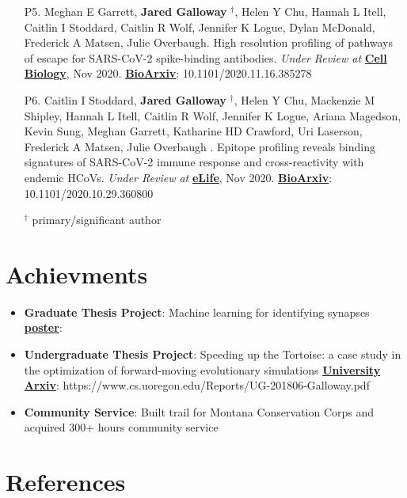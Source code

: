 \documentclass[letterpaper,11pt]{article}
\let\oldhref\href
\renewcommand{\href}[2]{\oldhref{#1}{\bfseries#2}}
\newcommand{\resumeItem}[2]{
  \item\small{
    \textbf{#1}{: #2 \vspace{-2pt}}
  }
}
\newcommand{\resumeSubItem}[2]{\resumeItem{#1}{#2}\vspace{-4pt}}
\newcommand{\resumeSubHeadingListStart}{\begin{itemize}[leftmargin=*]}
\newcommand{\resumeSubHeadingListEnd}{\end{itemize}}
\begin{document}
\begin{enumerate}
\item [P5.] Meghan E Garrett, \textbf{Jared Galloway} $^{\dagger}$, 
Helen Y Chu, Hannah L Itell, Caitlin I Stoddard, Caitlin R Wolf, Jennifer K Logue, Dylan McDonald, Frederick A Matsen, Julie Overbaugh.
High resolution profiling of pathways of escape for SARS-CoV-2 spike-binding antibodies.
\textit{Under Review at}
\href{https://www.nature.com/ncb/}{Cell Biology}, Nov 2020.
\href{https://www.biorxiv.org/content/10.1101/2020.11.16.385278v1.abstract}{BioArxiv}: 10.1101/2020.11.16.385278

\item [P6.] Caitlin I Stoddard, \textbf{Jared Galloway} $^{\dagger}$, 
Helen Y Chu, Mackenzie M Shipley, Hannah L Itell, 
Caitlin R Wolf, Jennifer K Logue, Ariana Magedson, Kevin Sung, Meghan Garrett, Katharine HD Crawford, Uri Laserson, Frederick A Matsen, Julie Overbaugh . 
Epitope profiling reveals binding signatures of SARS-CoV-2 immune response and cross-reactivity with endemic HCoVs.
\textit{Under Review at}
\href{https://elifesciences.org/?gclid=CjwKCAiA6vXwBRBKEiwAYE7iS0LA_KboY5NjoOVJAMq06BEUSsqPFV9R1GA1NUUIgYw2XgTiv1fUxhoC3xYQAvD_BwE}{eLife}, Nov 2020.
\href{biorxiv.org/content/10.1101/2020.10.29.360800v1.abstract}{BioArxiv}: 10.1101/2020.10.29.360800

\begin{center}
$^{\dagger}$ primary/significant author
\end{center}

\end{enumerate}


\section{Achievments}


\resumeSubHeadingListStart
    \resumeSubItem{Graduate Thesis Project}
    {
        Machine learning for identifying synapses
    }\href{}{poster}:  
    \resumeSubItem{Undergraduate Thesis Project}
    {
        Speeding up the Tortoise: a case study in the optimization of forward-moving evolutionary simulations
    }\href{https://www.cs.uoregon.edu/Reports/UG-201806-Galloway.pdf}{University Arxiv}: https://www.cs.uoregon.edu/Reports/UG-201806-Galloway.pdf
    \resumeSubItem{Community Service}
    {
        Built trail for Montana Conservation Corps and acquired 300+
        hours community service
    }
\resumeSubHeadingListEnd


\section{References}
\end{document}
